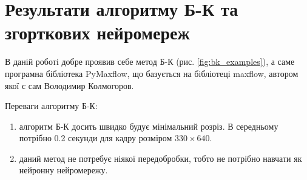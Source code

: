 \section{Результати алгоритму Б-К та згорткових нейромереж}

В даній роботі добре проявив себе метод Б-К (рис. \ref{fig:bk_examples}),
а саме програмна бібліотека PyMaxflow,
що базується на бібліотеці maxflow, автором якої є сам Володимир Колмогоров.

Переваги алгоритму Б-К:
\begin{enumerate}
    \item алгоритм Б-К досить швидко будує мінімальний розріз. В середньому
          потрібно 0.2 секунди для кадру розміром $330 \times 640$.
    \item даний метод не потребує ніякої передобробки, тобто не потрібно навчати
          як нейронну нейромережу.
\end{enumerate}

